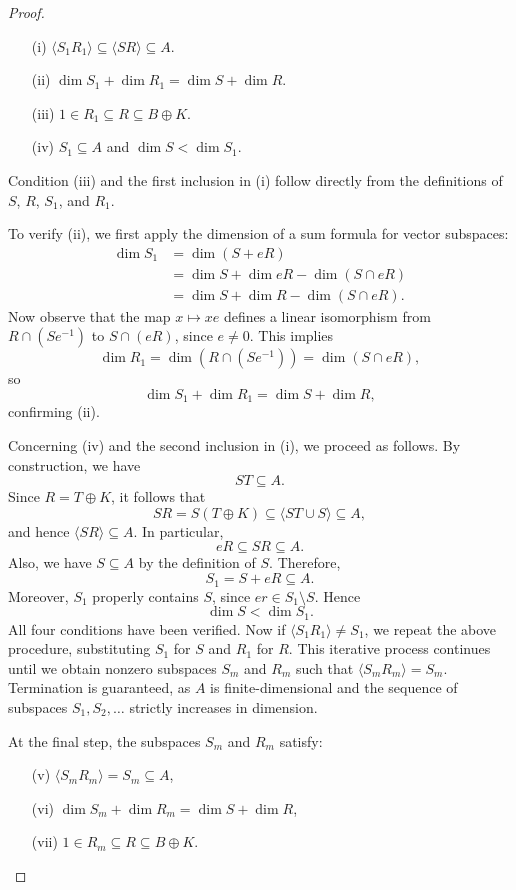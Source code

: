 \documentclass[11pt]{amsart}
\theoremstyle{definition}
\theoremstyle{remark}
\begin{document}
\begin{proof}
\begin{enumerate}
    \item[(i)] \( \langle S_1 R_1\rangle \subseteq \langle SR\rangle \subseteq A \).
    \item[(ii)] \( \dim S_1 + \dim R_1 = \dim S + \dim R \).
    \item[(iii)] \( 1 \in R_1 \subseteq R \subseteq B \oplus K \).
    \item[(iv)] \( S_1 \subseteq A \) and \( \dim S < \dim S_1 \).
\end{enumerate}
Condition (iii) and the first inclusion in (i) follow directly from the definitions of \( S \), \( R \), \( S_1 \), and \( R_1 \). 

To verify (ii), we first apply the dimension of a sum formula for vector subspaces:
\begin{align*}
\dim S_1 &= \dim(S + eR) \\
         &= \dim S + \dim eR - \dim(S \cap eR) \\
         &= \dim S + \dim R - \dim(S \cap eR).
\end{align*}
Now observe that the map \( x \mapsto xe \) defines a linear isomorphism from \( R \cap (S e^{-1}) \) to \( S \cap (eR) \), since \( e \neq 0 \). This implies
\[
\dim R_1 = \dim(R \cap (S e^{-1})) = \dim(S \cap eR),
\]
so
\[
\dim S_1 + \dim R_1 = \dim S + \dim R,
\]
confirming (ii).

Concerning (iv) and the second inclusion in (i), we proceed as follows. By construction, we have
\[
S T \subseteq A.
\]
Since \( R = T \oplus K \), it follows that
\[
S R = S (T \oplus K) \subseteq \langle S T \cup S \rangle \subseteq A,
\]
and hence \( \langle SR \rangle \subseteq A \).  In particular,
\[
eR \subseteq SR \subseteq A.
\]
Also, we have \( S \subseteq A \) by the definition of \( S \). Therefore,
\[
S_1 = S + eR \subseteq A.
\]
Moreover, \( S_1 \) properly contains \( S \), since \( e r \in S_1 \setminus S \). Hence
\[
\dim S < \dim S_1.
\]
All four conditions have been verified. Now if \( \langle S_1 R_1 \rangle \neq S_1 \), we repeat the above procedure, substituting \( S_1 \) for \( S \) and \( R_1 \) for \( R \). This iterative process continues until we obtain nonzero subspaces \( S_m \) and \( R_m \) such that \( \langle S_m R_m \rangle = S_m \). Termination is guaranteed, as \( A \) is finite-dimensional and the sequence of subspaces \( S_1, S_2, \ldots \) strictly increases in dimension.

At the final step, the subspaces \( S_m \) and \( R_m \) satisfy:
\begin{itemize}
\item[(v)] \( \langle S_m R_m \rangle = S_m \subseteq A \),
\item[(vi)] \( \dim S_m + \dim R_m = \dim S + \dim R \),
\item[(vii)] \( 1 \in R_m \subseteq R \subseteq B \oplus K \).
\end{itemize}


\end{proof}
\end{document}
